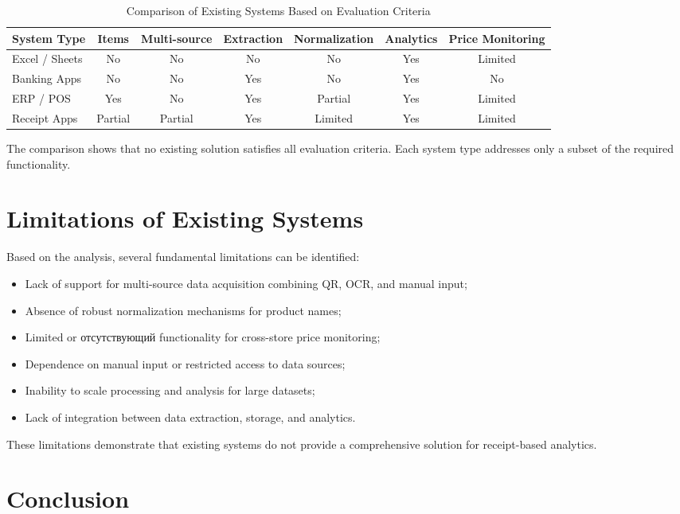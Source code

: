 \begin{table}[h]
\centering
\caption{Comparison of Existing Systems Based on Evaluation Criteria}
\begin{tabular}{|l|c|c|c|c|c|c|}
\hline
\textbf{System Type} & \textbf{Items} & \textbf{Multi-source} & \textbf{Extraction} & \textbf{Normalization} & \textbf{Analytics} & \textbf{Price Monitoring} \\
\hline
Excel / Sheets & No & No & No & No & Yes & Limited \\
\hline
Banking Apps & No & No & Yes & No & Yes & No \\
\hline
ERP / POS & Yes & No & Yes & Partial & Yes & Limited \\
\hline
Receipt Apps & Partial & Partial & Yes & Limited & Yes & Limited \\
\hline
\end{tabular}
\end{table}

The comparison shows that no existing solution satisfies all evaluation criteria. Each system type addresses only a subset of the required functionality.

\section{Limitations of Existing Systems}

Based on the analysis, several fundamental limitations can be identified:

\begin{itemize}
    \item Lack of support for multi-source data acquisition combining QR, OCR, and manual input;
    \item Absence of robust normalization mechanisms for product names;
    \item Limited or отсутствующий functionality for cross-store price monitoring;
    \item Dependence on manual input or restricted access to data sources;
    \item Inability to scale processing and analysis for large datasets;
    \item Lack of integration between data extraction, storage, and analytics.
\end{itemize}

These limitations demonstrate that existing systems do not provide a comprehensive solution for receipt-based analytics.

\section{Conclusion}

